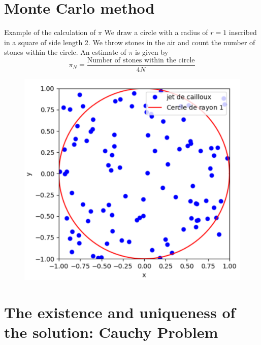 \documentclass[aspectratio=1610]{beamer}
\begin{document}
\section{Monte Carlo method}
\begin{frame}{Example of the calculation of $\pi$}
We draw a circle with a radius of $r = 1$ inscribed in a square of side length 2. We throw stones in the air and count the number of stones within the circle. An estimate of $\pi$ is given by 
\begin{equation*}
    \pi_N =\frac{\text{Number of stones within the circle}}{4 N}
\end{equation*}
\begin{figure}[h]
  \centering
  \includegraphics[height=0.5\textheight]{pi.png}
  \label{fig:circle_mc}
\end{figure}
\end{frame}


\section{The existence and uniqueness of the solution: Cauchy Problem}
\end{document}
